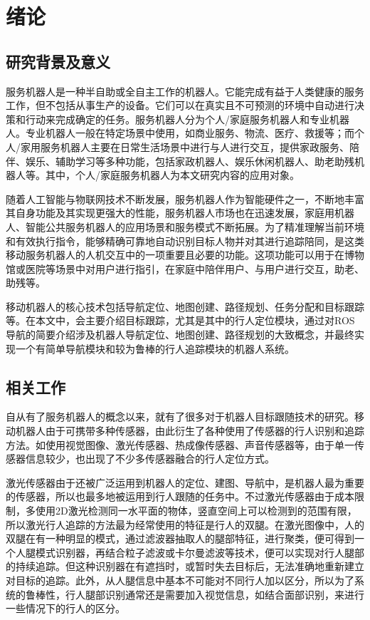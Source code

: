 
\chapter{绪论}

\section{研究背景及意义}

  服务机器人是一种半自助或全自主工作的机器人。它能完成有益于人类健康的服务工作，但不包括从事生产的设备。它们可以在真实且不可预测的环境中自动进行决策和行动来完成确定的任务。服务机器人分为个人/家庭服务机器人和专业机器人。专业机器人一般在特定场景中使用，如商业服务、物流、医疗、救援等；而个人/家用服务机器人主要在日常生活场景中进行与人进行交互，提供家政服务、陪伴、娱乐、辅助学习等多种功能，包括家政机器人、娱乐休闲机器人、助老助残机器人等。其中，个人/家庭服务机器人为本文研究内容的应用对象。

  随着人工智能与物联网技术不断发展，服务机器人作为智能硬件之一，不断地丰富其自身功能及其实现更强大的性能，服务机器人市场也在迅速发展，家庭用机器人、智能公共服务机器人的应用场景和服务模式不断拓展。为了精准理解当前环境和有效执行指令，能够精确可靠地自动识别目标人物并对其进行追踪陪同，是这类移动服务机器人的人机交互中的一项重要且必要的功能。这项功能可以用于在博物馆或医院等场景中对用户进行指引，在家庭中陪伴用户、与用户进行交互，助老、助残等。

  移动机器人的核心技术包括导航定位、地图创建、路径规划、任务分配和目标跟踪等。在本文中，会主要介绍目标跟踪，尤其是其中的行人定位模块，通过对ROS导航的简要介绍涉及机器人导航定位、地图创建、路径规划的大致概念，并最终实现一个有简单导航模块和较为鲁棒的行人追踪模块的机器人系统。

\section{相关工作}

  自从有了服务机器人的概念以来，就有了很多对于机器人目标跟随技术的研究。移动机器人由于可携带多种传感器，由此衍生了各种使用了传感器的行人识别和追踪方法。如使用视觉图像、激光传感器、热成像传感器\cite{treptow2006real}、声音传感器\cite{zhou2008target}等，由于单一传感器信息较少，也出现了不少多传感器融合的行人定位方式\cite{susperregi2013rgb}。

  激光传感器由于还被广泛运用到机器人的定位、建图、导航中，是机器人最为重要的传感器，所以也最多地被运用到行人跟随的任务中。不过激光传感器由于成本限制，多使用2D激光检测同一水平面的物体，竖直空间上可以检测到的范围有限，所以激光行人追踪的方法最为经常使用的特征是行人的双腿\cite{arras2008efficient}。在激光图像中，人的双腿在有一种明显的模式，通过滤波器抽取人的腿部特征，进行聚类，便可得到一个人腿模式识别器，再结合粒子滤波或卡尔曼滤波等技术，便可以实现对行人腿部的持续追踪。但这种识别器在有遮挡时，或暂时失去目标后，无法准确地重新建立对目标的追踪。此外，从人腿信息中基本不可能对不同行人加以区分，所以为了系统的鲁棒性，行人腿部识别通常还是需要加入视觉信息，如结合面部识别，来进行一些情况下的行人的区分\cite{kleinehagenbrock2002person,bellotto2008multisensor}。

